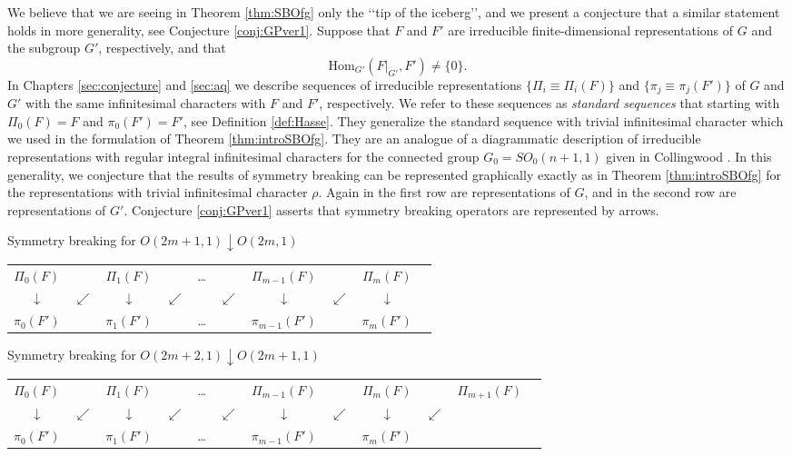 We believe that we are seeing in Theorem \ref{thm:SBOfg}
 only the \lq\lq{tip of the iceberg}\rq\rq, 
 and we present a conjecture that a similar statement holds
 in more generality, 
 see Conjecture \ref{conj:GPver1}.  
Suppose that $F$ and $F'$ are irreducible finite-dimensional 
 representations
 of $G$ and the subgroup $G'$, 
 respectively,  and 
 that
\[ \mbox{Hom}_{G'}(F|_{G'},F') \not = \{0\}.\] 
In Chapters \ref{sec:conjecture} and \ref{sec:aq}
 we describe  sequences of irreducible representations $\{\Pi_i\equiv \Pi_i(F) \}$
 and $\{\pi_j \equiv \pi_j(F') \}$ of $G$ and $G'$
 with the same infinitesimal characters with $F$ and $F'$,
 respectively.  
We refer to these  sequences as {\it{standard sequences}}
 that starting with $\Pi_0(F)=F$
 and $\pi_0(F')=F'$, 
 see Definition \ref{def:Hasse}. 
They generalize the standard sequence 
 with trivial infinitesimal character
 which we used in the formulation of Theorem \ref{thm:introSBOfg}.  
They are an analogue of a diagrammatic description
 of irreducible representations 
 with regular integral infinitesimal characters for the connected group $G_0=SO_0(n+1,1)$
 given in Collingwood
 \cite[p.~144, Fig.~6.3]{C}.  
In this generality,
 we conjecture
 that the results of symmetry breaking can be represented
 graphically exactly as in Theorem \ref{thm:introSBOfg} 
 for the representations
 with trivial infinitesimal character $\rho$.   
Again in the first row are representations of $G$, 
 and in the second row are representations of $G'$. 
Conjecture \ref{conj:GPver1} asserts 
 that symmetry breaking operators are represented by  arrows.


 \medskip
{Symmetry breaking for $O(2m+1,1)\downarrow O(2m,1)$ }

\begin{center}
\begin{tabular}{c@{~}c@{~}c@{~}c@{~}c@{~}c@{~}c@{~}c@{~}c@{~}c}
$\Pi_0(F)$ & &$\Pi_1(F)$ & &\dots & & $\Pi_{m-1}(F)$ & &$\Pi_{m}(F)$ 
\\
$\downarrow$ & $\swarrow$ & $\downarrow$ & $\swarrow$ &  & $\swarrow$ & $ \downarrow $ & $\swarrow $ &  $\downarrow$ 
\\
$\pi_0(F')$ & & $\pi_1(F')$ & &\dots & & $\pi_{m-1}(F')$ & & $\pi_{m}(F')$ 
\end{tabular}
\end{center}
\label{fig:introHa1}

 \medskip
{Symmetry breaking for $O(2m+2,1)\downarrow O(2m+1,1)$ }

\begin{center}
\begin{tabular}{@{}c@{~}c@{~}c@{~}c@{~}c@{~}c@{~}c@{~}c@{~}c@{~}c@{~}c@{~}c@{}}
$\Pi_0(F)$& &$\Pi_1(F)$ & & \dots & & $\Pi_{m-1}(F)$& & $\Pi_{m}(F)$ & & $\Pi_{m+1}(F)$
\\
$\downarrow$ &$\swarrow$& $\downarrow $& $\swarrow$ &  & $\swarrow$ & $ \downarrow $& $\swarrow $ & $\downarrow$ & $\swarrow$ & \\
$\pi_0(F')$& &$\pi_1(F')$& &\dots  & & $\pi_{m-1}(F')$ & & $\pi_{m}(F')$ 
\end{tabular}
\end{center}
\label{fig:introHa2}



